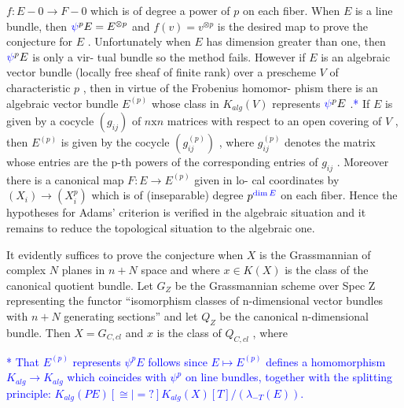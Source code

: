 \documentclass[11pt]{article}
\newcommand{\scanpage}[1]{\par\bigskip\noindent{\small\sffamily[scan #1]}\par}
\newcommand{\mspage}[1]{{\small\sffamily[p.\,#1]}}
\newcommand{\hand}[1]{\textcolor{blue}{#1}}
\newcommand{\unsure}[1]{[#1?]}
\begin{document}
\clearpage
\scanpage{162-5/58}
$f:E - 0 \rightarrow F - 0$ which is of degree a power of $p$ on each fiber.
When $E$ is a line bundle, then $\hand{\psi}^pE = E^{\otimes p}$ and $f(v) = v^{\otimes p}$ is
the desired map to prove the conjecture for $E$ . Unfortunately
when $E$ has dimension greater than one, then $\hand{\psi}^pE$ is only a vir-%
tual bundle so the method fails. However if $E$ is an algebraic
vector bundle (locally free sheaf of finite rank) over a prescheme
$V$ of characteristic $p$ , then in virtue of the Frobenius homomor-%
phism there is an algebraic vector bundle $E^{(p)}$ whose class in
$K_{alg}(V)$ represents $\hand{\psi}^pE$ .\hand{*} If $E$ is given by a cocycle $(g_{ij})$ of
$n\mathrm{x}n$ matrices with respect to an open covering of $V$ , then $E^{(p)}$
is given by the cocycle $(g_{ij}^{(p)})$ , where $g_{ij}^{(p)}$ denotes the matrix
whose entries are the p-th powers of the corresponding entries of
$g_{ij}$ . Moreover there is a canonical map $F:E \rightarrow E^{(p)}$ given in lo-%
cal coordinates by $(X_i) \rightarrow (X_i^p)$ which is of (inseparable) degree
$p^{\hand{\dim E}}$ on each fiber. Hence the hypotheses for Adams' criterion is
verified in the algebraic situation and it remains to reduce the
topological situation to the algebraic one.

It evidently suffices to prove the conjecture when $X$ is the
Grassmannian of complex $N$ planes in $n + N$ space and where
$x \in K(X)$ is the class of the canonical quotient bundle. Let $G_Z$
be the Grassmannian scheme over Spec Z representing the functor
``isomorphism classes of n-dimensional vector bundles with $n + N$
generating sections'' and let $Q_Z$ be the canonical n-dimensional
bundle. Then $X = G_{C,cl}$ and $x$ is the class of $Q_{C,cl}$ , where

\hand{* That $E^{(p)}$ represents $\psi^pE$ follows since $E \mapsto E^{(p)}$ defines a
homomorphism $K_{alg} \rightarrow K_{alg}$ which coincides with $\psi^p$ on line bundles,
together with the splitting principle: $K_{alg}(PE) \unsure{\cong|=} K_{alg}(X)[T]/(\lambda_{-T}(E))$.}

\mspage{58}

\clearpage
\scanpage{162-5/59}
\mspage{- 3 -}
\end{document}
